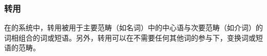 \subsubsection{转用}
\label{sec-transfer-dg}

在\tes 的系统中，转用被用于主要范畴（如名词）中的中心语与次要范畴（如介词）的词相组合的词或短语。另外，转用可以在不需要任何其他词的参与下，变换词或短语的范畴。


